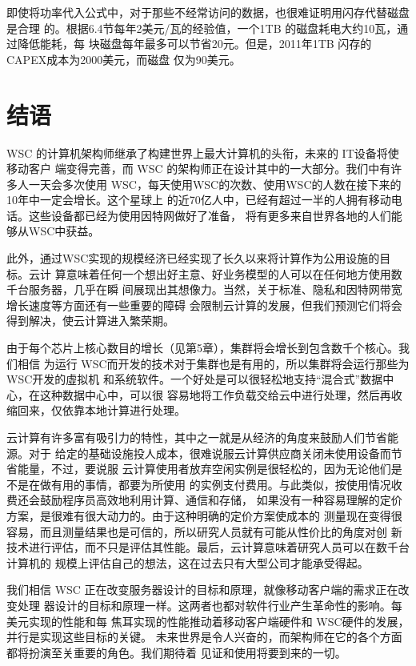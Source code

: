 即使将功率代入公式中，对于那些不经常访问的数据，也很难证明用闪存代替磁盘是合理
的。根据6.4节每年2美元/瓦的经验值，一个1TB 的磁盘耗电大约10瓦，通过降低能耗，每
块磁盘每年最多可以节省20元。但是，2011年1TB 闪存的 CAPEX成本为2000美元，而磁盘
仅为90美元。

\section{结语}
WSC 的计算机架构师继承了构建世界上最大计算机的头衔，未来的 IT设备将使移动客户
端变得完善，而 WSC 的架构师正在设计其中的一大部分。我们中有许多人一天会多次使用
WSC，每天使用WSC的次数、使用WSC的人数在接下来的10年中一定会增长。这个星球上
的近70亿人中，已经有超过一半的人拥有移动电话。这些设备都已经为使用因特网做好了准备，
将有更多来自世界各地的人们能够从WSC中获益。

此外，通过WSC实现的规模经济已经实现了长久以来将计算作为公用设施的目标。云计
算意味着任何一个想出好主意、好业务模型的人可以在任何地方使用数千台服务器，几乎在瞬
间展现出其想像力。当然，关于标准、隐私和因特网带宽增长速度等方面还有一些重要的障碍
会限制云计算的发展，但我们预测它们将会得到解决，使云计算进入繁荣期。

由于每个芯片上核心数目的增长（见第5章），集群将会增长到包含数千个核心。我们相信
为运行 WSC而开发的技术对于集群也是有用的，所以集群将会运行那些为 WSC开发的虛拟机
和系统软件。一个好处是可以很轻松地支持“混合式”数据中心，在这种数据中心中，可以很
容易地将工作负载交给云中进行处理，然后再收缩回来，仅依靠本地计算进行处理。

云计算有许多富有吸引力的特性，其中之一就是从经济的角度来鼓励人们节省能源。对于
给定的基础设施投人成本，很难说服云计算供应商关闭未使用设备而节省能量，不过，要说服
云计算使用者放弃空闲实例是很轻松的，因为无论他们是不是在做有用的事情，都要为所使用
的实例支付费用。与此类似，按使用情况收费还会鼓励程序员高效地利用计算、通信和存储，
如果没有一种容易理解的定价方案，是很难有很大动力的。由于这种明确的定价方案使成本的
测量现在变得很容易，而且测量结果也是可信的，所以研究人员就有可能从性价比的角度对创
新技术进行评估，而不只是评估其性能。最后，云计算意味着研究人员可以在数千台计算机的
规模上评估自己的想法，这在过去只有大型公司才能承受得起。

我们相信 WSC 正在改变服务器设计的目标和原理，就像移动客户端的需求正在改变处理
器设计的目标和原理一样。这两者也都对软件行业产生革命性的影响。每美元实现的性能和每
焦耳实现的性能推动着移动客户端硬件和 WSC硬件的发展，并行是实现这些目标的关键。
未来世界是令人兴奋的，而架构师在它的各个方面都将扮演至关重要的角色。我们期待着
见证和使用将要到来的一切。

